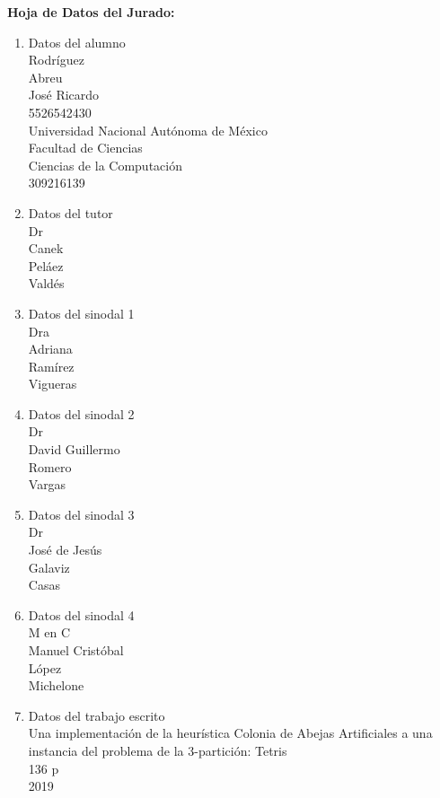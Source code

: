 
\begin{center}
{\large \textbf{Hoja de Datos del Jurado:}}
\end{center}
\begin{enumerate}

\item Datos del alumno \\
Rodríguez \\
Abreu \\
José Ricardo \\
5526542430 \\
Universidad Nacional Autónoma de México \\
Facultad de Ciencias \\
Ciencias de la Computación \\
309216139 

\item Datos del tutor \\
Dr \\
Canek \\
Peláez \\
Valdés \\

\item Datos del sinodal 1 \\
Dra \\
Adriana \\
Ramírez \\
Vigueras \\

\item Datos del sinodal 2 \\
Dr \\
David Guillermo \\
Romero \\
Vargas \\

\item Datos del sinodal 3 \\
Dr \\
José de Jesús \\
Galaviz \\
Casas \\

\item Datos del sinodal 4 \\
M en C \\
Manuel Cristóbal \\
López \\
Michelone \\

\item Datos del trabajo escrito \\
Una implementación de la heurística Colonia de Abejas Artificiales a una instancia del problema de la 3-partición: Tetris \\
136 p \\
2019 
\end{enumerate} 
\newpage